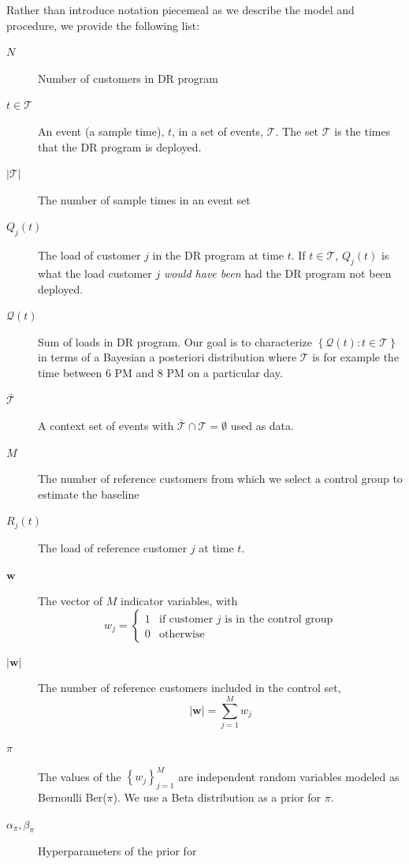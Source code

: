 \documentclass[journal]{IEEEtran}
\newcommand{\eventset}{\mathcal{T}}
\newcommand{\wvector}{\mathbf w}
\newcommand{\context}{{\bar {\mathcal{T}}}}
\newcommand{\drpower}{Q}
\newcommand{\sumdrpower}{{\mathcal{Q}}}
\newcommand{\referencepower}{R}
\begin{document}
Rather than introduce notation piecemeal as we describe the model and
procedure, we provide the following list:
\begin{description}
\item[$N$] Number of customers in DR program
\item[$t\in \eventset$] An event (a sample time), $t$, in a set of
  events, $\eventset$.  The set $\eventset$ is the times that the DR
  program is deployed.
\item[$\left| \eventset \right|$] The number of sample times in an
  event set
\item[$\drpower_j(t)$] The load of customer $j$ in the DR program at
  time $t$.  If $t\in \eventset$, $\drpower_j(t)$ is what the load
  customer $j$ \emph{would have been} had the DR program not been
  deployed.
\item[$\sumdrpower(t)$] Sum of loads in DR program.  Our goal is to
  characterize $\left\{ \sumdrpower(t) : t \in \eventset \right\}$ in
  terms of a Bayesian a posteriori distribution where $\eventset$ is
  for example the time between 6 PM and 8 PM on a particular day.
\item[$\context$] A context set of events with $\context \cap
  \eventset = \emptyset$ used as data.
\item[$M$] The number of reference customers from which we select a
  control group to estimate the baseline
\item[$\referencepower_j(t)$] The load of reference customer $j$ at
  time $t$.
\item[$\wvector$] The vector of $M$ indicator variables,
  with
  \begin{equation*}
    w_j =
    \begin{cases}
      1 & \text{if customer } j \text{ is in the control group}\\
      0 & \text{otherwise}
    \end{cases}
  \end{equation*}
\item[$\left| \wvector \right|$] The number of reference customers
  included in the control set,
  \begin{equation*}
    \left| \wvector \right| = \sum_{j=1}^M w_j
  \end{equation*}
\item[$\pi$] The values of the $\left\{ w_j \right\}_{j=1}^M$ are
  independent random variables modeled as Bernoulli Ber($\pi$).  We
  use a Beta distribution as a prior for $\pi$.
\item [$\alpha_\pi, \beta_\pi$] Hyperparameters of the prior for

\end{description}
\end{document}
